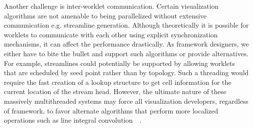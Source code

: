 \documentclass{vgtc}                          %
\newcommand*{\lcite}[1]{~\cite{#1}}
\newcommand*{\keyterm}[1]{\emph{#1}}
\begin{document}
Another challenge is inter-worklet communication. Certain visualization
algorithms are not amenable to being parallelized without extensive 
communication e.g. streamline generation. Although theoretically it is possible
for worklets to communicate with each other using explicit synchronization
mechanisms, it can affect the performance drastically. As framework designers, we
either have to bite the bullet and support such algorithms or provide
alternatives.  For example, streamlines could potentially be supported by
allowing worklets that are scheduled by seed point rather than by
topology.  Such a threading would require the fast creation of a lookup
structure to get cell information for the current location of the stream
head.  However, the ultimate nature of these massively multithreaded
systems may force all visualization developers, regardless of framework, to
favor alternate algorithms that perform more localized operations such as
line integral convolution~\lcite{SurfaceLIC}.





\end{document}
